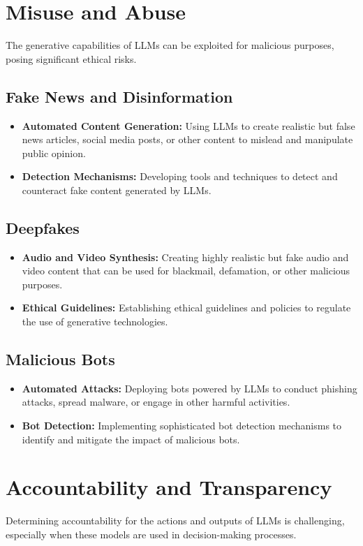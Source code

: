 \section{Misuse and Abuse}
The generative capabilities of LLMs can be exploited for malicious purposes, posing significant ethical risks.

\subsection{Fake News and Disinformation}
\begin{itemize}
    \item \textbf{Automated Content Generation:} Using LLMs to create realistic but false news articles, social media posts, or other content to mislead and manipulate public opinion.
    \item \textbf{Detection Mechanisms:} Developing tools and techniques to detect and counteract fake content generated by LLMs.
\end{itemize}

\subsection{Deepfakes}
\begin{itemize}
    \item \textbf{Audio and Video Synthesis:} Creating highly realistic but fake audio and video content that can be used for blackmail, defamation, or other malicious purposes.
    \item \textbf{Ethical Guidelines:} Establishing ethical guidelines and policies to regulate the use of generative technologies.
\end{itemize}

\subsection{Malicious Bots}
\begin{itemize}
    \item \textbf{Automated Attacks:} Deploying bots powered by LLMs to conduct phishing attacks, spread malware, or engage in other harmful activities.
    \item \textbf{Bot Detection:} Implementing sophisticated bot detection mechanisms to identify and mitigate the impact of malicious bots.
\end{itemize}

\section{Accountability and Transparency}
Determining accountability for the actions and outputs of LLMs is challenging, especially when these models are used in decision-making processes.

